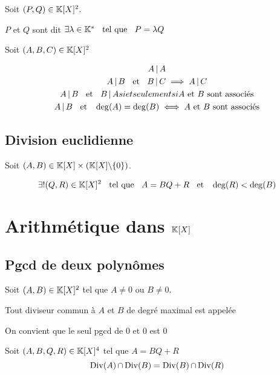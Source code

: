 \begin{dfn}
  Soit $(P, Q) \in \mathbb{K}[X]^2$.

  $P$ et $Q$ sont dit  \ssi
  $\exists \lambda \in \mathbb{K}^* \;\;\text{ tel que }\;\; P = \lambda Q$
\end{dfn}

\begin{prp}
  Soit $(A, B, C) \in \mathbb{K}[X]^2$
  
  \begin{gather*}
    A \operatorname{|} A \\
    A \operatorname{|} B \;\;\text{ et }\;\; B \operatorname{|} C \implies A \operatorname{|} C \\
    A \operatorname{|} B \;\;\text{ et }\;\; B \operatorname{|} A si et seulement si \text{$A$ et $B$ sont associés} \\
    A \operatorname{|} B \;\;\text{ et }\;\; \deg(A) = \deg(B) \iff \text{$A$ et $B$ sont associés}
  \end{gather*}
\end{prp}

\subsection{Division euclidienne}

\begin{thm}
  Soit $(A, B) \in \mathbb{K}[X] \times (\mathbb{K}[X] \backslash \{0\})$.

  \[
    \exists! (Q, R) \in \mathbb{K}[X]^2 \;\;\text{ tel que }\;\; A = B Q + R \;\;\text{ et }\;\; \deg(R) < \deg(B)
  \]
\end{thm}

\section{Arithmétique dans $\mathbb{K}[X]$}

\subsection{Pgcd de deux polynômes}

\begin{dfn}
  Soit $(A, B) \in \mathbb{K}[X]^2$ tel que $A \neq 0$ ou $B \neq 0$.
  
  Tout diviseur commun à $A$ et $B$ de degré maximal est appelée

  On convient que le seul pgcd de $0$ et $0$ est $0$
\end{dfn}

\begin{prp}
  Soit $(A, B, Q, R) \in \mathbb{K}[X]^4$ tel que $A = BQ + R$
  \[
    \operatorname{\mathrm{Div}}(A) \operatorname{\cap} \operatorname{\mathrm{Div}}(B) = \operatorname{\mathrm{Div}}(B) \operatorname{\cap} \operatorname{\mathrm{Div}}(R)
  \]
\end{prp}

